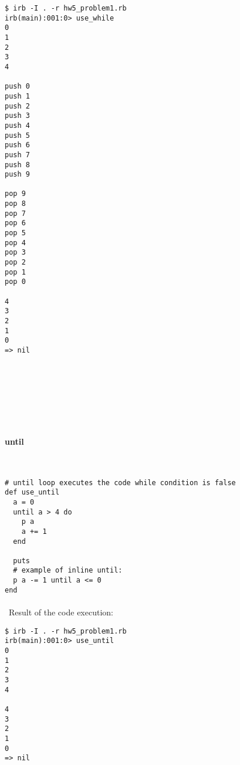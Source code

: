 \documentclass{article}
\begin{document}
\begin{verbatim} 
$ irb -I . -r hw5_problem1.rb
irb(main):001:0> use_while
0
1
2
3
4

push 0
push 1
push 2
push 3
push 4
push 5
push 6
push 7
push 8
push 9

pop 9
pop 8
pop 7
pop 6
pop 5
pop 4
pop 3
pop 2
pop 1
pop 0

4
3
2
1
0
=> nil
\end{verbatim}

\paragraph{}\
\paragraph{}\
\paragraph{}\

\paragraph{ until}\

\begin{verbatim}
# until loop executes the code while condition is false
def use_until
  a = 0
  until a > 4 do
    p a
    a += 1
  end

  puts
  # example of inline until:
  p a -= 1 until a <= 0
end
\end{verbatim}

\paragraph{}\
Result of the code execution:

\begin{verbatim} 
$ irb -I . -r hw5_problem1.rb
irb(main):001:0> use_until
0
1
2
3
4

4
3
2
1
0
=> nil
\end{verbatim}

\paragraph{}\
\paragraph{}\
\end{document}
